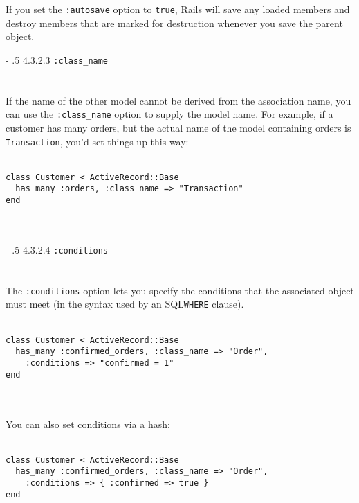\documentclass[10pt]{book}
\makeatletter
\renewcommand\paragraph{%
   \@startsection{paragraph}{4}{0mm}%
      {-\baselineskip}%
      {.5\baselineskip}%
      {\normalfont\scriptsize\bfseries}}
\makeatother
\begin{document}
If you set the \texttt{:autosave} option to \texttt{true}, Rails will save any loaded members and destroy members that are marked for destruction whenever you save the parent object.

\paragraph{4.3.2.3 \texttt{:class\_name}}\\ \\\\

If the name of the other model cannot be derived from the association name, you can use the \texttt{:class\_name}  option to supply the model name. For example, if a customer has many  orders, but the actual name of the model containing orders is \texttt{Transaction}, you’d set things up this way:
\\ \\
\begin{minipage}{\textwidth}{\scriptsize
\begin{verbatim}
class Customer < ActiveRecord::Base
  has_many :orders, :class_name => "Transaction"
end
\end{verbatim}}
\end{minipage}
\\ \\

\paragraph{4.3.2.4 \texttt{:conditions}}\\ \\\\

The \texttt{:conditions} option lets you specify the conditions that the associated object must meet (in the syntax used by an SQL\texttt{WHERE} clause).
\\ \\
\begin{minipage}{\textwidth}{\scriptsize
\begin{verbatim}
class Customer < ActiveRecord::Base
  has_many :confirmed_orders, :class_name => "Order",
    :conditions => "confirmed = 1"
end
\end{verbatim}}
\end{minipage}
\\ \\

You can also set conditions via a hash:
\\ \\
\begin{minipage}{\textwidth}{\scriptsize
\begin{verbatim}
class Customer < ActiveRecord::Base
  has_many :confirmed_orders, :class_name => "Order",
    :conditions => { :confirmed => true }
end
\end{verbatim}}
\end{minipage}
\\ \\
\end{document}
